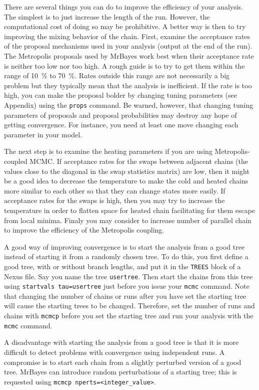 \documentclass[12pt]{book}
\begin{document}
There are several things you can do to improve the efficiency of your analysis. The simplest is to
just increase the length of the run. However, the computational cost of doing so may be
prohibitive. A better way is then to try improving the mixing behavior of the chain. First, examine
the acceptance rates of the proposal mechanisms used in your analysis (output at the end of the
run). The Metropolis proposals used by MrBayes work best when their acceptance rate is neither too
low nor too high. A rough guide is to try to get them within the range of 10~\% to 70~\%. Rates
outside this range are not necessarily a big problem but they typically mean that the analysis is
inefficient. If the rate is too high, you can make the proposal bolder by changing tuning
parameters (see Appendix) using the \texttt{props} command. Be warned, however, that changing
tuning parameters of proposals and proposal probabilities may destroy any hope of getting
convergence. For instance, you need at least one move changing each parameter in your model.

The next step is to examine the heating parameters if you are using Metropolis-coupled MCMC. If
acceptance rates for the swaps between adjacent chains (the values close to the diagonal in the
swap statistics matrix) are low, then it might be a good idea to decrease the temperature to make
the cold and heated chains more similar to each other so that they can change states more easily.
If acceptance rates for the swaps is high, then you may try to increase the temperature in order to
flatten space for heated chain facilitating for them escape from local minima. Finaly you may
consider to increase number of parallel chain to improve the efficiency of the Metropolis coupling.

A good way of improving convergence is to start the analysis from a good tree instead of starting
it from a randomly chosen tree. To do this, you first define a good tree, with or without branch
lengths, and put it in the \texttt{TREES} block of a Nexus file. Say you name the tree
\texttt{usertree}.  Then start the chains from this tree using \texttt{startvals tau=usertree} just
before you issue your \texttt{mcmc} command. Note that changing the number of chains or runs after
you have set the starting tree will cause the starting trees to be changed. Therefore, set the
number of runs and chains with \texttt{mcmcp} before you set the starting tree and run your
analysis with the \texttt{mcmc} command.

A disadvantage with starting the analysis from a good tree is that it is more difficult to detect
problems with convergence using independent runs. A compromise is to start each chain from a
slightly perturbed version of a good tree. MrBayes can introduce random perturbations of a starting
tree; this is requested using \texttt{mcmcp nperts=<integer\_value>}.
\end{document}
